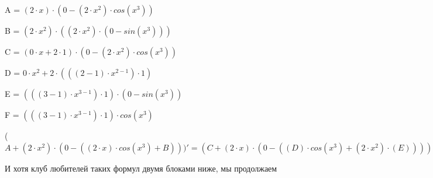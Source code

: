 \documentclass[12pt,a4paper,fleqn]{article}
\begin{document}
\begin{center}
A = $(2 \cdot x) \cdot (0-(2 \cdot x^{2}) \cdot cos(x^{3}))$\end{center}
\begin{center}
B = $(2 \cdot x^{2}) \cdot ((2 \cdot x^{2}) \cdot (0-sin(x^{3})))$\end{center}
\begin{center}
C = $(0 \cdot x+2 \cdot 1) \cdot (0-(2 \cdot x^{2}) \cdot cos(x^{3}))$\end{center}
\begin{center}
D = $0 \cdot x^{2}+2 \cdot (((2-1) \cdot x^{2-1}) \cdot 1)$\end{center}
\begin{center}
E = $(((3-1) \cdot x^{3-1}) \cdot 1) \cdot (0-sin(x^{3}))$\end{center}
\begin{center}
F = $(((3-1) \cdot x^{3-1}) \cdot 1) \cdot cos(x^{3})$\end{center}
\begin{center}
 ($A+(2 \cdot x^{2}) \cdot (0-((2 \cdot x) \cdot cos(x^{3})+B)))'
  = (C+(2 \cdot x) \cdot (0-((D) \cdot cos(x^{3})+(2 \cdot x^{2}) \cdot (E))))+((D) \cdot (0-((2 \cdot x) \cdot cos(x^{3})+B))+(2 \cdot x^{2}) \cdot (0-(((0 \cdot x+2 \cdot 1) \cdot cos(x^{3})+(2 \cdot x) \cdot (E))+((D) \cdot ((2 \cdot x^{2}) \cdot (0-sin(x^{3})))+(2 \cdot x^{2}) \cdot ((D) \cdot (0-sin(x^{3}))+(2 \cdot x^{2}) \cdot (0-F))))))$\end{center}
И хотя клуб любителей таких формул двумя блоками ниже, мы продолжаем
\end{document}
